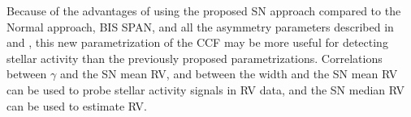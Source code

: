 \documentclass{aa}
\begin{document}
Because of the advantages of using the proposed SN approach compared to the Normal approach, BIS SPAN, and all the asymmetry parameters described in \citet{Boisse-2011} and \citet{Figueira-2013}, this new parametrization of the CCF may be more useful for detecting stellar activity than the previously proposed parametrizations.
Correlations between $\gamma$ and the SN mean RV, and between the width and the SN mean RV can be used to probe stellar activity signals in RV data, and the SN median RV can be used to estimate RV.




\end{document}
